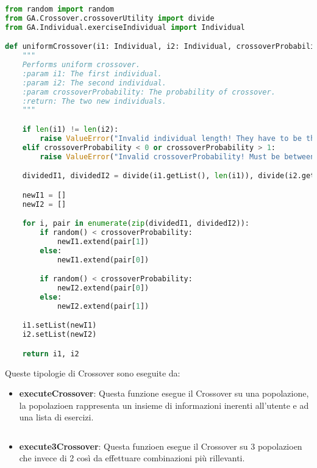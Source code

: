 \documentclass{article}
\begin{document}
\begin{lstlisting}[language=Python, breaklines, no caption]
from random import random
from GA.Crossover.crossoverUtility import divide
from GA.Individual.exerciseIndividual import Individual

def uniformCrossover(i1: Individual, i2: Individual, crossoverProbability: float) -> tuple[Individual, Individual]:
    """
    Performs uniform crossover.
    :param i1: The first individual.
    :param i2: The second individual.
    :param crossoverProbability: The probability of crossover.
    :return: The two new individuals.
    """

    if len(i1) != len(i2):
        raise ValueError("Invalid individual length! They have to be the same.")
    elif crossoverProbability < 0 or crossoverProbability > 1:
        raise ValueError("Invalid crossoverProbability! Must be between 0 and 1")

    dividedI1, dividedI2 = divide(i1.getList(), len(i1)), divide(i2.getList(), len(i2))

    newI1 = []
    newI2 = []

    for i, pair in enumerate(zip(dividedI1, dividedI2)):
        if random() < crossoverProbability:
            newI1.extend(pair[1])
        else:
            newI1.extend(pair[0])

        if random() < crossoverProbability:
            newI2.extend(pair[0])
        else:
            newI2.extend(pair[1])

    i1.setList(newI1)
    i2.setList(newI2)

    return i1, i2
\end{lstlisting}

Queste tipologie di Crossover sono eseguite da:
\begin{itemize}
\item\textbf{executeCrossover}: Questa funzione esegue il Crossover su una popolazione, la popolazioen rappresenta un insieme di informazioni inerenti all'utente e ad una lista di esercizi.
\end{itemize}
\begin{lstlisting}[language=Python, breaklines, no caption]

\end{lstlisting}

\begin{itemize}
\item\textbf{execute3Crossover}: Questa funzioen esegue il Crossover su 3 popolazioen che invece di 2 così da effettuare combinazioni più rillevanti.
\end{itemize}
\end{document}
